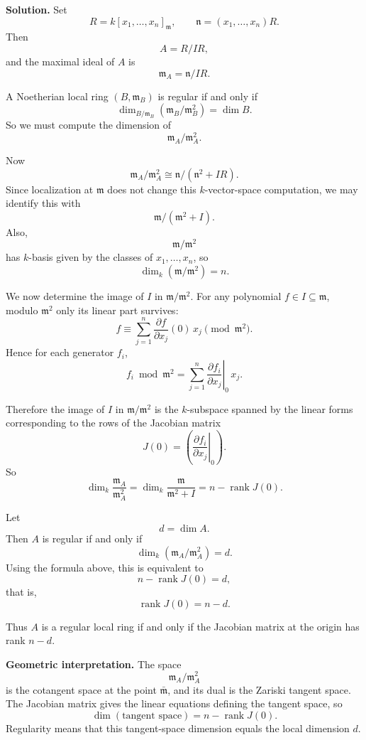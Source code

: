 \documentclass[12pt,a4paper]{article}
\theoremstyle{plain}
\theoremstyle{definition}      %
\begin{document}
	\textbf{Solution.}
	Set
	\[
	R=k[x_1,\dots,x_n]_{\mathfrak m},
	\qquad
	\mathfrak n=(x_1,\dots,x_n)R.
	\]
	Then
	\[
	A=R/IR,
	\]
	and the maximal ideal of \(A\) is
	\[
	\mathfrak m_A=\mathfrak n/IR.
	\]
	
	A Noetherian local ring \((B,\mathfrak m_B)\) is regular if and only if
	\[
	\dim_{B/\mathfrak m_B}(\mathfrak m_B/\mathfrak m_B^2)=\dim B.
	\]
	So we must compute the dimension of
	\[
	\mathfrak m_A/\mathfrak m_A^2.
	\]
	
	Now
	\[
	\mathfrak m_A/\mathfrak m_A^2
	\cong
	\mathfrak n/(\mathfrak n^2+IR).
	\]
	Since localization at \(\mathfrak m\) does not change this \(k\)-vector-space computation, we may identify this with
	\[
	\mathfrak m/(\mathfrak m^2+I).
	\]
	Also,
	\[
	\mathfrak m/\mathfrak m^2
	\]
	has \(k\)-basis given by the classes of \(x_1,\dots,x_n\), so
	\[
	\dim_k(\mathfrak m/\mathfrak m^2)=n.
	\]
	
	We now determine the image of \(I\) in \(\mathfrak m/\mathfrak m^2\). For any polynomial \(f\in I\subseteq \mathfrak m\), modulo \(\mathfrak m^2\) only its linear part survives:
	\[
	f \equiv \sum_{j=1}^n \frac{\partial f}{\partial x_j}(0)\,x_j
	\pmod{\mathfrak m^2}.
	\]
	Hence for each generator \(f_i\),
	\[
	f_i \bmod \mathfrak m^2
	=
	\sum_{j=1}^n
	\left.\frac{\partial f_i}{\partial x_j}\right|_{0}\,x_j.
	\]
	
	Therefore the image of \(I\) in \(\mathfrak m/\mathfrak m^2\) is the \(k\)-subspace spanned by the linear forms corresponding to the rows of the Jacobian matrix
	\[
	J(0)=
	\left(\left.\frac{\partial f_i}{\partial x_j}\right|_{0}\right).
	\]
	So
	\[
	\dim_k\frac{\mathfrak m_A}{\mathfrak m_A^2}
	=
	\dim_k\frac{\mathfrak m}{\mathfrak m^2+I}
	=
	n-\operatorname{rank}J(0).
	\]
	
	Let
	\[
	d=\dim A.
	\]
	Then \(A\) is regular if and only if
	\[
	\dim_k(\mathfrak m_A/\mathfrak m_A^2)=d.
	\]
	Using the formula above, this is equivalent to
	\[
	n-\operatorname{rank}J(0)=d,
	\]
	that is,
	\[
	\operatorname{rank}J(0)=n-d.
	\]
	
	Thus \(A\) is a regular local ring if and only if the Jacobian matrix at the origin has rank \(n-d\).
	
	\medskip
	
	\textbf{Geometric interpretation.}
	The space
	\[
	\mathfrak m_A/\mathfrak m_A^2
	\]
	is the cotangent space at the point \(\bar{\mathfrak m}\), and its dual is the Zariski tangent space. The Jacobian matrix gives the linear equations defining the tangent space, so
	\[
	\dim(\text{tangent space})=n-\operatorname{rank}J(0).
	\]
	Regularity means that this tangent-space dimension equals the local dimension \(d\).
	
\end{document}
